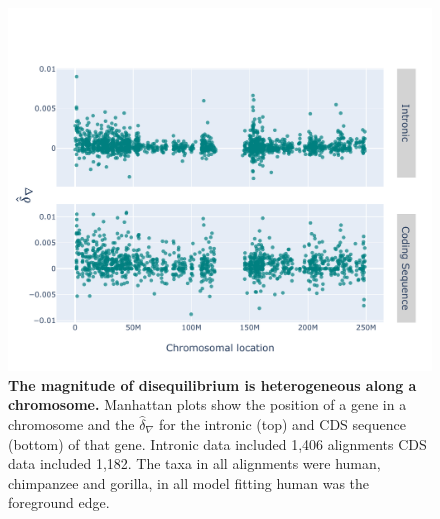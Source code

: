 \begin{figure}[htbp]
\centering
\includegraphics[width=	\textwidth]{figures/plots/primate/d-conv-manhatten.pdf}
\caption[The magnitude of disequilibrium is heterogeneous along a chromosome]{\textbf{The magnitude of disequilibrium is heterogeneous along a chromosome.} Manhattan plots show the position of a gene in a chromosome and the $\hat\delta_\nabla$ for the intronic (top) and CDS sequence (bottom) of that gene. Intronic data included 1,406 alignments CDS data included 1,182. The taxa in all alignments were human, chimpanzee and gorilla, in all model fitting human was the foreground edge. }
\label{fig:primate:dconv-manhattan}
\end{figure}
